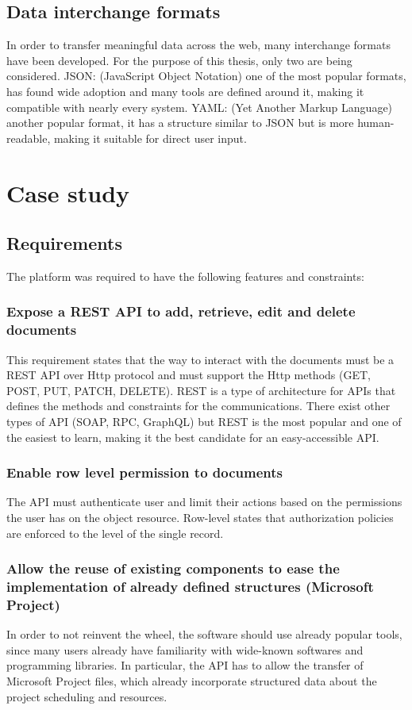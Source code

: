 \documentclass[12pt]{report}
\begin{document}
\section{Data interchange formats}
In order to transfer meaningful data across the web, many interchange formats have been developed. For the purpose of this thesis, only two are being considered.\newline
JSON: (JavaScript Object Notation) one of the most popular formats, has found wide adoption and many tools are defined around it, making it compatible with nearly every system.\newline
YAML: (Yet Another Markup Language) another popular format, it has a structure similar to JSON but is more human-readable, making it suitable for direct user input.

\chapter{Case study}

\section{Requirements}
The platform was required to have the following features and constraints:

\subsection{Expose a REST API to add, retrieve, edit and delete documents}
This requirement states that the way to interact with the documents must be a REST API over Http protocol and must support the Http methods (GET, POST, PUT, PATCH, DELETE).
REST is a type of architecture for APIs that defines the methods and constraints for the communications.
There exist other types of API (SOAP, RPC, GraphQL) but REST is the most popular and one of the easiest to learn, making it the best candidate for an easy-accessible API.

\subsection{Enable row level permission to documents}
The API must authenticate user and limit their actions based on the permissions the user has on the object resource. Row-level states that authorization policies are enforced to the level of the single record.

\subsection{Allow the reuse of existing components to ease the implementation of already defined structures (Microsoft Project)}
In order to not reinvent the wheel, the software should use already popular tools, since many users already have familiarity with wide-known softwares and programming libraries. In particular, the API has to allow the transfer of Microsoft Project files, which already incorporate structured data about the project scheduling and resources.
\end{document}
